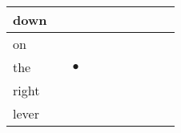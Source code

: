\documentclass[landscape]{article}
\newcommand{\ssp}{\hspace{2pt}}
\newcommand{\mex}{\cellcolor{g}$\bullet$}
\begin{document}
\begin{tabular}{|l|p{10pt}|p{10pt}|p{10pt}|p{10pt}|p{10pt}|p{10pt}|p{10pt}|p{10pt}|p{10pt}|}
\hline
\ssp down \ssp&\hspace{2pt}&\hspace{2pt}&\hspace{2pt}&\hspace{2pt}&\hspace{2pt}&\hspace{2pt}&\hspace{2pt}&\hspace{2pt}&\hspace{2pt}\\
\hline
\ssp on \ssp&\hspace{2pt}&\hspace{2pt}&\hspace{2pt}&\hspace{2pt}&\hspace{2pt}&\hspace{2pt}&\hspace{2pt}&\hspace{2pt}&\hspace{2pt}\\
\hline
\ssp \cellcolor{ref1}the \ssp&\hspace{2pt}&\hspace{2pt}\mex&\hspace{2pt}&\hspace{2pt}&\hspace{2pt}&\hspace{2pt}&\hspace{2pt}&\hspace{2pt}&\hspace{2pt}\\
\hline
\ssp right \ssp&\hspace{2pt}&\hspace{2pt}&\hspace{2pt}&\hspace{2pt}&\hspace{2pt}&\hspace{2pt}&\hspace{2pt}&\hspace{2pt}&\hspace{2pt}\\
\hline
\ssp lever \ssp&\hspace{2pt}&\hspace{2pt}&\hspace{2pt}&\hspace{2pt}&\hspace{2pt}&\hspace{2pt}&\hspace{2pt}&\hspace{2pt}&\hspace{2pt}\\

\end{tabular}
\end{document}
